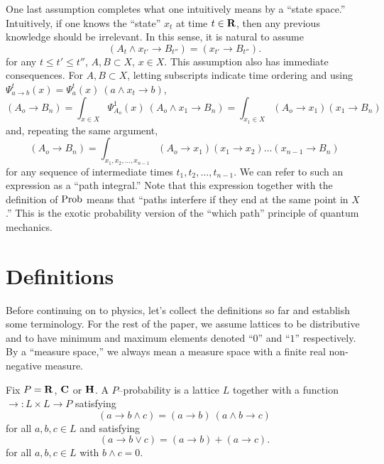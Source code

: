 \documentclass[12pt]{article}
\begin{document}
    One last assumption completes what one intuitively means by a ``state space.''
Intuitively, if one knows the ``state'' $x_t$ at time $t\in {\bf R}$, then any previous
knowledge should be irrelevant.  In this sense, it is natural to assume 
\begin{equation}
(A_t\wedge x_{t'}\rightarrow B_{t''})=(x_{t'}\rightarrow B_{t''}).
\end{equation}
for any $t\leq t'\leq t''$, $A,B\subset X$, $x\in X$.  This assumption also has
immediate consequences.  For $A,B\subset X$, letting subscripts indicate time ordering
and using $\Psi^t_{a\rightarrow b}(x) = \Psi^t_a(x)\ (a\wedge x_t\rightarrow b)$,
\begin{equation}
(A_o\rightarrow B_n)=\int_{x\in X} \Psi^1_{A_o}(x)\ (A_o\wedge x_1\rightarrow B_n)=
\int_{x_1\in X} (A_o\rightarrow x_1)(x_1\rightarrow B_n)
\end{equation}
and, repeating the same argument,
\begin{equation}
(A_o\rightarrow B_n) = \int_{x_1,x_2,\dots,x_{n-1}} (A_o\rightarrow x_1)(x_1\rightarrow x_2)\dots(x_{n-1}\rightarrow B_n)
\end{equation}
for any sequence of intermediate times $t_1,t_2,\dots,t_{n-1}$.  We can refer to such 
an expression as a ``path integral.''  Note that this expression together with the 
definition of ${\rm Prob}$ means that ``paths interfere if they end at the same 
point in $X$.''  This is the exotic probability version of the ``which path'' principle of 
quantum mechanics.

\section{Definitions}

    Before continuing on to physics, let's collect the definitions so far and
establish some terminology.  For the rest of the paper, we assume lattices to be
distributive and to have minimum and maximum 
elements denoted ``$0$'' and ``$1$'' respectively. By 
a ``measure space,'' we always mean a measure space with a finite
real non-negative measure. 

Fix $P={\bf R}$, ${\bf C}$ or ${\bf H}$.  A $P$--probability is a lattice $L$ 
together with a function $\rightarrow:L\times L\rightarrow P$ satisfying
\begin{equation}
(a\rightarrow b\wedge c)=(a\rightarrow b)\ (a\wedge b\rightarrow c)
\end{equation}
for all $a,b,c\in L$ and satisfying
\begin{equation}
(a\rightarrow b\vee c)=(a\rightarrow b)+(a\rightarrow c).
\end{equation}
for all $a,b,c\in L$ with $b\wedge c=0$.
\end{document}
